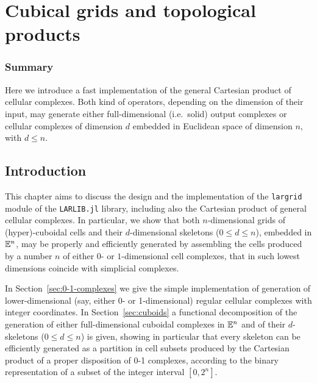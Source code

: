 \chapter{Cubical grids and topological products}

\subsection{Summary}

Here we introduce a fast implementation of the general Cartesian product of cellular complexes. Both kind of operators, depending on the dimension of their input, may generate either full-dimensional (i.e.~solid) output complexes or cellular complexes of dimension $d$ embedded in Euclidean space of dimension $n$, with $d\leq n$. 

\section{Introduction}
This chapter aims to discuss the design and the implementation of the \texttt{largrid} module of the \texttt{LARLIB.jl} library, including also the Cartesian product of general cellular complexes. 
In particular, we show that both $n$-dimensional grids of (hyper)-cuboidal cells and their  $d$-dimensional skeletons ($0\leq d\leq n$), embedded in $\mathbb{E}^n$, may be properly and efficiently generated by assembling the cells produced by a number $n$ of either $0$- or $1$-dimensional cell complexes, that in such lowest dimensions coincide with simplicial complexes. 

In Section~\ref{sec:0-1-complexes} we give the simple implementation of generation of lower-dimensional (say, either 0- or 1-dimensional) regular cellular complexes with integer coordinates.
In Section~\ref{sec:cuboids} a functional decomposition of the generation of either full-dimensional cuboidal complexes in $\mathbb{E}^n$ and of their $d$-skeletons ($0\leq d\leq n$) is given, showing in particular that every skeleton can be efficiently generated as a partition in cell subsets produced by the Cartesian product of a proper disposition of 0-1 complexes, according to the binary representation of a subset of the integer interval $[0,2^n]$.

